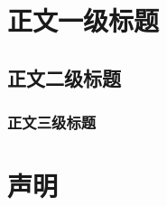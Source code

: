\documentclass{pkuthesis}
\author{学生姓名（作者）}
\begin{document}
\section{正文一级标题}
\subsection{正文二级标题}
\subsubsection{正文三级标题}
\printbibliography %

\appendix
\section{声明}

\acknowledgments
\end{document}
